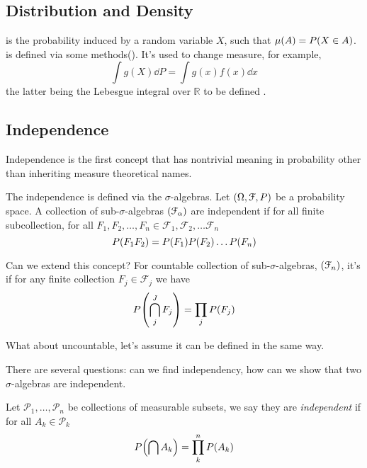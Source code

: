\subsection{Distribution and Density}

 is the probability induced by a random variable \(X\), such that \(\mu(A) = P\pqty{X \in A}\).  is defined via some methods(). It's used to change measure, for example,
\begin{equation*}
    \int g(X) \dd{P} = \int g(x)f(x)\dd{x}
\end{equation*}
the latter being the Lebesgue integral over \(\mathbb{R}\) to be defined .

\subsection{Independence}


Independence is the first concept that has nontrivial meaning in probability other than inheriting measure theoretical names. 

The independence is defined via the \(\sigma\)-algebras. Let \(\pqty{\Omega, \mathcal{F}, P}\) be a probability space. A collection of sub-\(\sigma\)-algebras \(\pqty{\mathcal{F}_{\alpha}}\) are independent if for all finite subcollection, for all \(F_{1}, F_{2}, \dots, F_{n} \in\mathcal{F}_{1}, \mathcal{F}_{2}, \dots \mathcal{F}_{n}\)
\begin{equation*}
    P\pqty{F_{1} F_{2}} = P(F_{1}) P(F_{2}) \dots P \pqty{F_{n}}
\end{equation*}

Can we extend this concept? For countable collection of sub-\(\sigma\)-algebras, \(\pqty{\mathcal{F}_{n}}\), it's  if for any finite collection \(F_{j} \in \mathcal{F}_{j}\) we have 
\begin{equation*}
    P\pqty{\bigcap_{j}^{J} F_{j}} = \prod_{j} P \pqty{F_{j}}
\end{equation*}

What about uncountable, let's assume it can be defined in the same way. 

There are several questions: can we find independency, how can we show that two \(\sigma\)-algebras are independent. 


Let \(\mathcal{P}_{1}, \dots, \mathcal{P}_{n}\) be collections of measurable subsets, we say they are \textit{independent} if for all \(A_{k}\in \mathcal{P}_{k}\)
\begin{equation*}
    P\pqty{\cap A_{k} } = \prod_{k}^{n} P(A_{k})
\end{equation*}

